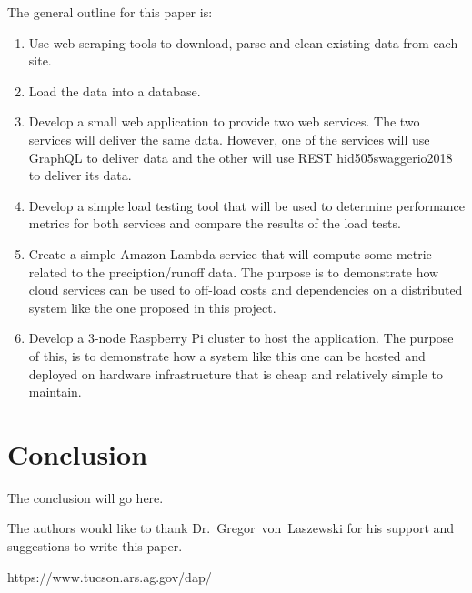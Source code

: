 The general outline for this paper is:

\begin{enumerate}
\item Use web scraping tools to download, parse and clean existing data from each 
site.  
\item Load the data into a database.  
\item Develop a small web application to provide two web services.  The two 
services will deliver the same data.  However, one of the services will use 
GraphQL to deliver data and the other will use REST \cite{}hid505swaggerio2018 to 
deliver its data. 
\item Develop a simple load testing tool that will be used to determine 
performance metrics for both services and compare the results of the load tests.
\item Create a simple Amazon Lambda service that will compute some metric related to 
the preciption/runoff data.  The purpose is to demonstrate how cloud services can 
be used to off-load costs and dependencies on a distributed system like the one 
proposed in this project.
\item Develop a 3-node Raspberry Pi cluster to host the application.  The purpose 
of this, is to demonstrate how a system like this one can be hosted and deployed 
on hardware infrastructure that is cheap and relatively simple to maintain.
\end{enumerate}

\section{Conclusion}
The conclusion will go here.

\begin{acks}

  The authors would like to thank Dr.~Gregor~von~Laszewski for his support and 
  suggestions to write this paper.
  
\end{acks}


 

https://www.tucson.ars.ag.gov/dap/